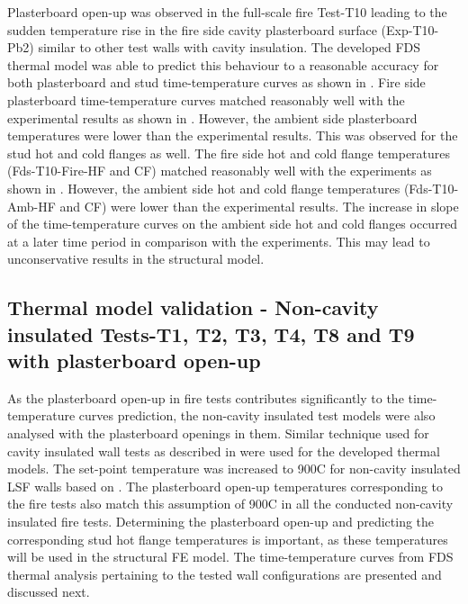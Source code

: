 Plasterboard open-up was observed in the full-scale fire Test-T10 leading to the sudden temperature rise in the fire side cavity plasterboard surface (Exp-T10-Pb2) similar to other test walls with cavity insulation. The developed FDS thermal model was able to predict this behaviour to a reasonable accuracy for both plasterboard and stud time-temperature curves as shown in . Fire side plasterboard time-temperature curves matched reasonably well with the experimental results as shown in . However, the ambient side plasterboard temperatures were lower than the experimental results. This was observed for the stud hot and cold flanges as well. The fire side hot and cold flange temperatures (Fds-T10-Fire-HF and CF) matched reasonably well with the experiments as shown in . However, the ambient side hot and cold flange temperatures (Fds-T10-Amb-HF and CF) were lower than the experimental results. The increase in slope of the time-temperature curves on the ambient side hot and cold flanges occurred at a later time period in comparison with the experiments. This may lead to unconservative results in the structural model. 

\subsection{Thermal model validation - Non-cavity insulated Tests-T1, T2, T3, T4, T8 and T9 with plasterboard open-up} \label{sec:thermal-model-non-cav}

As the plasterboard open-up in fire tests contributes significantly to the time-temperature curves prediction, the non-cavity insulated test models were also analysed with the plasterboard openings in them. Similar technique used for cavity insulated wall tests as described in  were used for the developed thermal models. The set-point temperature was increased to 900\degree C for non-cavity insulated LSF walls based on \citet{Sultan2015}. The plasterboard open-up temperatures corresponding to the fire tests also match this assumption of 900\degree C in all the conducted non-cavity insulated fire tests. Determining the plasterboard open-up and predicting the corresponding stud hot flange temperatures is important, as these temperatures will be used in the structural FE model. The time-temperature curves from FDS thermal analysis pertaining to the tested wall configurations are presented and discussed next.

